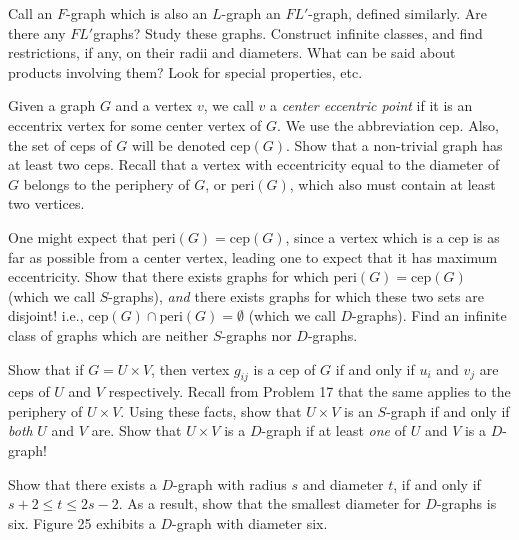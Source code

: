 \documentclass{article}
\begin{document}
\begin{description}
  Call an $F$-graph which is also an $L$-graph an $FL'$-graph, defined similarly. Are there any $FL'$graphs? Study these graphs. Construct infinite classes, and find restrictions, if any, on their radii and diameters. What can be said about products involving them? Look for special properties, etc.

\item[42.] Given a graph $G$ and a vertex $v$, we call $v$ a \emph{center eccentric point} if it is an eccentrix vertex for some center vertex of $G$. We use the abbreviation cep. Also, the set of ceps of $G$ will be denoted $\text{cep}(G)$. Show that a non-trivial graph has at least two ceps. Recall that a vertex with eccentricity equal to the diameter of $G$ belongs to the periphery of $G$, or $\text{peri}(G)$, which also must contain at least two vertices.

  One might expect that $\text{peri}(G) = \text{cep}(G)$, since a vertex which is a cep is as far as possible from a center vertex, leading one to expect that it has maximum eccentricity. Show that there exists graphs for which $\text{peri}(G) = \text{cep}(G)$ (which we call $S$-graphs), \emph{and} there exists graphs for which these two sets are disjoint! i.e., $\text{cep}(G) \cap \text{peri}(G) = \emptyset$ (which we call $D$-graphs). Find an infinite class of graphs which are neither $S$-graphs nor $D$-graphs.

  Show that if $G = U \times V$, then vertex $g_{ij}$ is a cep of $G$ if and only if $u_{i}$ and $v_j$ are ceps of $U$ and $V$ respectively. Recall from Problem 17 that the same applies to the periphery of $U \times V$. Using these facts, show that $U \times V$ is an $S$-graph if and only if \emph{both} $U$ and $V$ are. Show that $U \times V$ is a $D$-graph if at least \emph{one} of $U$ and $V$ is a $D$-graph!

  Show that there exists a $D$-graph with radius $s$ and diameter $t$, if and only if $s + 2 \leq t \leq 2s - 2$. As a result, show that the smallest diameter for $D$-graphs is six. Figure 25 exhibits a $D$-graph with diameter six.


\end{description}
\end{document}

